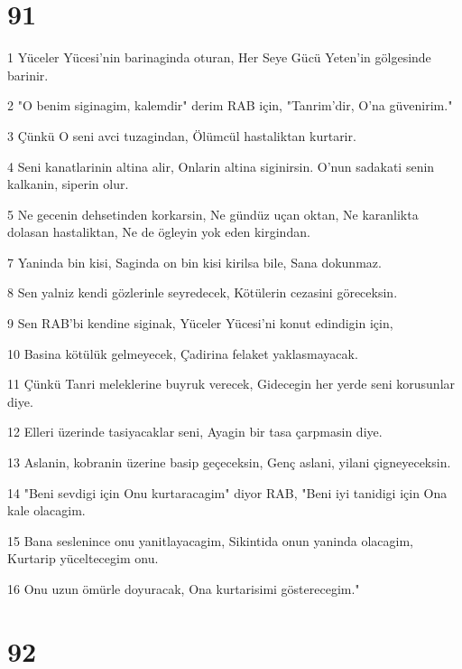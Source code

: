 \chapter{91}

\par 1 Yüceler Yücesi'nin barinaginda oturan, Her Seye Gücü Yeten'in gölgesinde barinir.
\par 2 "O benim siginagim, kalemdir" derim RAB için, "Tanrim'dir, O'na güvenirim."
\par 3 Çünkü O seni avci tuzagindan, Ölümcül hastaliktan kurtarir.
\par 4 Seni kanatlarinin altina alir, Onlarin altina siginirsin. O'nun sadakati senin kalkanin, siperin olur.
\par 5 Ne gecenin dehsetinden korkarsin, Ne gündüz uçan oktan, Ne karanlikta dolasan hastaliktan, Ne de ögleyin yok eden kirgindan.
\par 7 Yaninda bin kisi, Saginda on bin kisi kirilsa bile, Sana dokunmaz.
\par 8 Sen yalniz kendi gözlerinle seyredecek, Kötülerin cezasini göreceksin.
\par 9 Sen RAB'bi kendine siginak, Yüceler Yücesi'ni konut edindigin için,
\par 10 Basina kötülük gelmeyecek, Çadirina felaket yaklasmayacak.
\par 11 Çünkü Tanri meleklerine buyruk verecek, Gidecegin her yerde seni korusunlar diye.
\par 12 Elleri üzerinde tasiyacaklar seni, Ayagin bir tasa çarpmasin diye.
\par 13 Aslanin, kobranin üzerine basip geçeceksin, Genç aslani, yilani çigneyeceksin.
\par 14 "Beni sevdigi için Onu kurtaracagim" diyor RAB, "Beni iyi tanidigi için Ona kale olacagim.
\par 15 Bana seslenince onu yanitlayacagim, Sikintida onun yaninda olacagim, Kurtarip yüceltecegim onu.
\par 16 Onu uzun ömürle doyuracak, Ona kurtarisimi gösterecegim."

\chapter{92}

